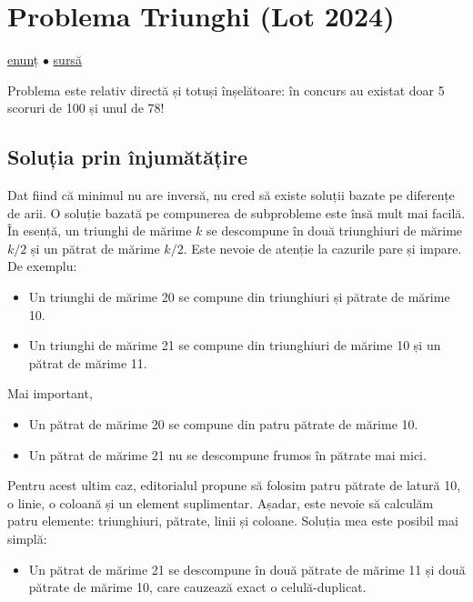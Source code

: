 \documentclass[../main.tex]{subfiles}
\begin{document}
\section{Problema Triunghi (Lot 2024)}
\label{problem:triunghi}

\href{https://kilonova.ro/problems/2797}{enunț}
$\bullet$
\hyperref[code:triunghi]{sursă}

Problema este relativ directă și totuși înșelătoare: în concurs au existat doar 5 scoruri de 100 și unul de 78!

\subsection{Soluția prin înjumătățire}

Dat fiind că minimul nu are inversă, nu cred să existe soluții bazate pe diferențe de arii. O soluție bazată pe compunerea de subprobleme este însă mult mai facilă. În esență, un triunghi de mărime $k$ se descompune în două triunghiuri de mărime $k / 2$ și un pătrat de mărime $k / 2$. Este nevoie de atenție la cazurile pare și impare. De exemplu:

\begin{itemize}
  \item Un triunghi de mărime 20 se compune din triunghiuri și pătrate de mărime 10.
  \item Un triunghi de mărime 21 se compune din triunghiuri de mărime 10 și un pătrat de mărime 11.
\end{itemize}

Mai important,

\begin{itemize}
  \item Un pătrat de mărime 20 se compune din patru pătrate de mărime 10.
  \item Un pătrat de mărime 21 nu se descompune frumos în pătrate mai mici.
\end{itemize}

Pentru acest ultim caz, editorialul propune să folosim patru pătrate de latură 10, o linie, o coloană și un element suplimentar. Așadar, este nevoie să calculăm patru elemente: triunghiuri, pătrate, linii și coloane. Soluția mea este posibil mai simplă:

\begin{itemize}
  \item Un pătrat de mărime 21 se descompune în două pătrate de mărime 11 și două pătrate de mărime 10, care cauzează exact o celulă-duplicat.
\end{itemize}
\end{document}
